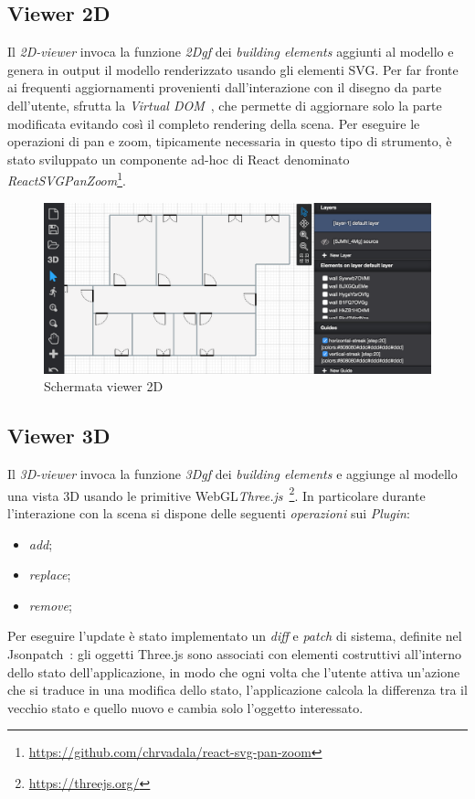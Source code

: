\subsection{Viewer 2D}
Il \emph{2D-viewer} invoca la funzione \emph{2Dgf} dei \emph{building elements} aggiunti al modello e
genera in output il modello renderizzato usando gli elementi SVG.
Per far fronte ai frequenti aggiornamenti provenienti dall'interazione con il disegno da parte dell'utente,
sfrutta la \emph{Virtual DOM}~\cite{vdom}, che permette di aggiornare solo la parte modificata evitando così
il completo rendering della scena. Per eseguire le operazioni di pan e zoom, tipicamente necessaria in questo
tipo di strumento, è stato sviluppato un componente ad-hoc
di React denominato \emph{ReactSVGPanZoom}\footnote{\url{https://github.com/chrvadala/react-svg-pan-zoom}}.\\


\begin{figure}[htbp] %
   \centering
   \includegraphics[width=1\linewidth]{images/2d}
   \caption{Schermata viewer 2D}
   \label{fig:view2D}
\end{figure}
\newpage


\subsection{Viewer 3D}
Il \emph{3D-viewer} invoca la funzione \emph{3Dgf} dei \emph{building elements} e aggiunge al modello una vista 3D usando
le primitive WebGL\emph{Three.js}~\footnote{\url{https://threejs.org/}}.
In particolare durante l'interazione con la scena si dispone delle seguenti \textit{operazioni} sui \emph{Plugin}:
\begin{itemize}
  \item \emph{add};
  \item \emph{replace};
  \item \emph{remove};
\end{itemize}
Per eseguire l'update è stato implementato un \emph{diff} e \emph{patch} di
sistema, definite nel Jsonpatch~\cite{rfc6902}: gli oggetti Three.js sono associati con elementi costruttivi all'interno
dello stato dell'applicazione, in modo che ogni volta che l'utente attiva un'azione che si traduce in una modifica dello stato,
l'applicazione calcola la differenza tra il vecchio stato e quello nuovo e cambia solo l'oggetto interessato.\\


